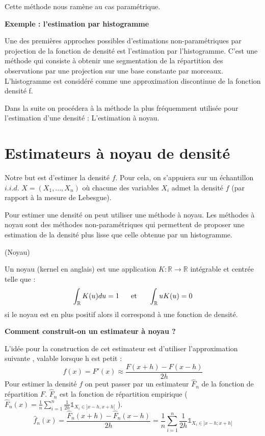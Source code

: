 \documentclass[
]{book}
\begin{document}
\begin{rem}
Cette méthode nous ramène au cas paramétrique.\newline
\end{rem}

\textbf{Exemple : l'estimation par histogramme}

\begin{exem}
  Une des premières approches possibles d'estimations non-paramétriques par projection de la fonction de densité est l'estimation par l'histogramme. C'est une méthode qui consiste à obtenir une segmentation de la répartition des observations par une projection sur une base constante par morceaux. L'histogramme est considéré comme une approximation discontinue de la fonction densité f.

\end{exem}

Dans la suite on procédera à la méthode la plus fréquemment utilisée pour l'estimation d'une densité : L'estimation à noyau.\newline 

\hypertarget{estimateurs-uxe0-noyau-de-densituxe9}{%
\section{Estimateurs à noyau de densité}\label{estimateurs-uxe0-noyau-de-densituxe9}}

Notre but est d'estimer la densité \(f\). Pour cela, on s'appuiera sur un échantillon \(i.i.d.\) \(X= (X_1,...,X_n)\) où chacune des variables \(X_i\) admet la densité \(f\) (par rapport à la mesure de Lebesgue).

Pour estimer une densité on peut utiliser une méthode à noyau.
Les méthodes à noyau sont des méthodes non-paramétriques qui permettent de proposer une estimation de la densité plus lisse que celle obtenue par un histogramme.

\begin{dfn} (Noyau)  

Un noyau (kernel en anglais) est une application $K:\mathbb{R}\rightarrow\mathbb{R}$ intégrable et centrée telle que :
$$\int_{\mathbb R} K(u) du = 1 ~~~~ \hbox{ et } ~~~~ \int_{\mathbb R} u K(u)=0$$
si le noyau est en plus positif alors il correspond à une fonction de densité.
\end{dfn}

\textbf{Comment construit-on un estimateur à noyau ?}

L'idée pour la construction de cet estimateur est d'utiliser l'approximation suivante , valable lorsque h est petit :\\
\[
f(x) = F'(x)\approx \frac{F(x+h)-F(x-h)}{2h}
\]
Pour estimer la densité \(f\) on peut passer par un estimateur \(\hat F_n\) de la fonction de répartition \(F\). \(\hat F_n\) est la fonction de répartition empirique ( \(\hat F_n(x)= \frac1n \sum\limits_{i=1}^n\frac{1}{2h} \mathds1_{X_i \in ]x-h, x+h[}\) ).
\[
\hat f_n(x)= \frac{\hat F_n(x+h)-\hat F_n(x-h)}{2h} = \frac 1n \sum\limits_{i=1}^n \frac1{2h} \mathds1_{X_i \in ]x-h;x+h]}
\]
\end{document}
